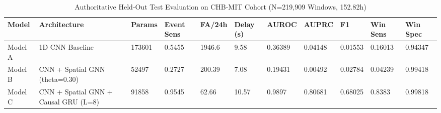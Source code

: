 \begin{table}[t]
\centering
\caption{Authoritative Held-Out Test Evaluation on CHB-MIT Cohort (N=219,909 Windows, 152.82h)}
\label{tab:final_test_performance}
\small
\begin{tabular}{lllllllllll}
\toprule
Model & Architecture & Params & Event Sens & FA/24h & Delay (s) & AUROC & AUPRC & F1 & Win Sens & Win Spec \\
\midrule
Model A & 1D CNN Baseline & 173601 & 0.5455 & 1946.6 & 9.58 & 0.36389 & 0.04148 & 0.01553 & 0.16013 & 0.94347 \\
Model B & CNN + Spatial GNN (theta=0.30) & 52497 & 0.2727 & 200.39 & 7.08 & 0.19431 & 0.00492 & 0.02784 & 0.04239 & 0.99418 \\
Model C & CNN + Spatial GNN + Causal GRU (L=8) & 91858 & 0.9545 & 62.66 & 10.57 & 0.9897 & 0.80681 & 0.68025 & 0.8383 & 0.99818 \\
\bottomrule
\end{tabular}
\end{table}
